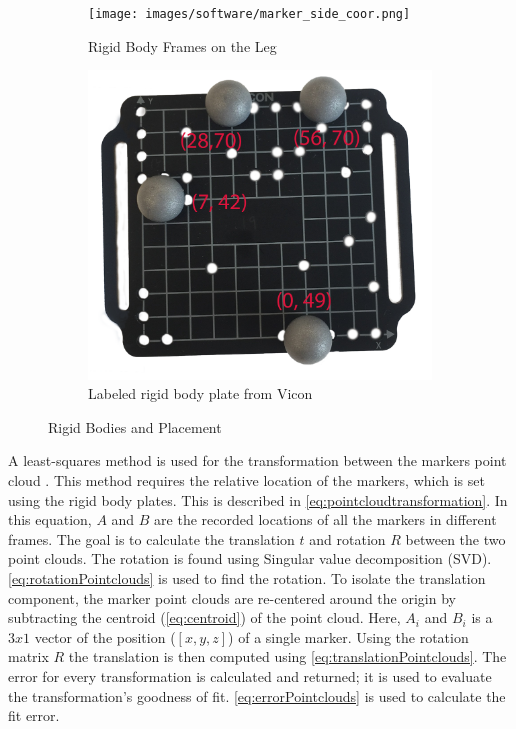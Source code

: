 \begin{figure}
\centering 
\begin{subfigure}{0.4\linewidth} 
  \centering 
  \texttt{[image: images/software/marker\_side\_coor.png]} 
  \caption[RigidBody Frames]{Rigid Body Frames on the Leg} 
  \label{fig:markers_side} 
\end{subfigure} 
%
\begin{subfigure}{0.4\linewidth} 
  \centering 
    \centering
    \includegraphics[scale=0.11]{images/software/rigidbody_label.png} 
    \caption{Labeled rigid body plate from Vicon}
    \label{fig:rigidbody}
\end{subfigure} 
\caption[Rigidbodies and Placement]{Rigid Bodies and Placement} 
\label{fig:markers} 

\end{figure} 

A least-squares method is used for the transformation between the markers point cloud \cite{arun1987least}. This method requires the relative location of the markers, which is set using the rigid body plates. This is described in \autoref{eq:pointcloudtransformation}. In this equation, $A$ and $B$ are the recorded locations of all the markers in different frames. The goal is to calculate the translation $t$ and rotation $R$ between the two point clouds. The rotation is found using Singular value decomposition (SVD). \autoref{eq:rotationPointclouds} is used to find the rotation. To isolate the translation component, the marker point clouds are re-centered around the origin by subtracting the centroid (\autoref{eq:centroid}) of the point cloud. Here, $A_i$ and $B_i$ is a $3x1$ vector of the position ($[x,y,z]$) of a single marker. Using the rotation matrix $R$ the translation is then computed using  \autoref{eq:translationPointclouds}.  The error for every transformation is calculated and returned; it is used to evaluate the transformation's goodness of fit. \autoref{eq:errorPointclouds} is used to calculate the fit error.   


